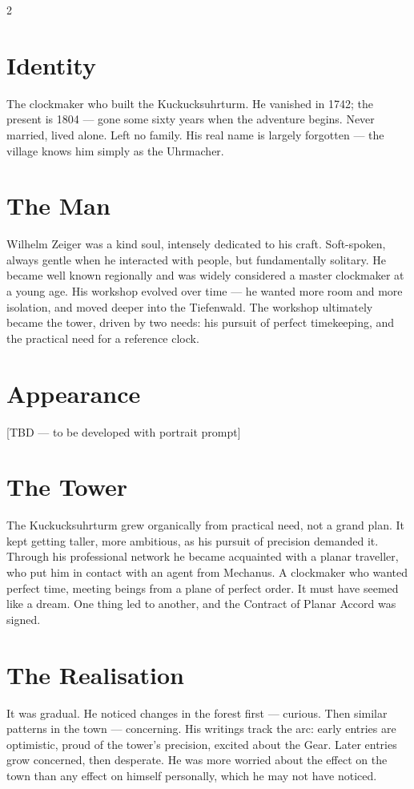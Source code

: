 \documentclass[10pt,letterpaper]{article}
\begin{document}
\begin{multicols}{2}

\section*{Identity}
The clockmaker who built the Kuckucksuhrturm. He vanished in 1742; the present is 1804 --- gone some sixty years when the adventure begins. Never married, lived alone. Left no family. His real name is largely forgotten --- the village knows him simply as the Uhrmacher.

\section*{The Man}
Wilhelm Zeiger was a kind soul, intensely dedicated to his craft. Soft-spoken, always gentle when he interacted with people, but fundamentally solitary. He became well known regionally and was widely considered a master clockmaker at a young age. His workshop evolved over time --- he wanted more room and more isolation, and moved deeper into the Tiefenwald. The workshop ultimately became the tower, driven by two needs: his pursuit of perfect timekeeping, and the practical need for a reference clock.

\section*{Appearance}
[TBD --- to be developed with portrait prompt]

\section*{The Tower}
The Kuckucksuhrturm grew organically from practical need, not a grand plan. It kept getting taller, more ambitious, as his pursuit of precision demanded it. Through his professional network he became acquainted with a planar traveller, who put him in contact with an agent from Mechanus. A clockmaker who wanted perfect time, meeting beings from a plane of perfect order. It must have seemed like a dream. One thing led to another, and the Contract of Planar Accord was signed.

\section*{The Realisation}
It was gradual. He noticed changes in the forest first --- curious. Then similar patterns in the town --- concerning. His writings track the arc: early entries are optimistic, proud of the tower's precision, excited about the Gear. Later entries grow concerned, then desperate. He was more worried about the effect on the town than any effect on himself personally, which he may not have noticed.


\end{multicols}
\end{document}

